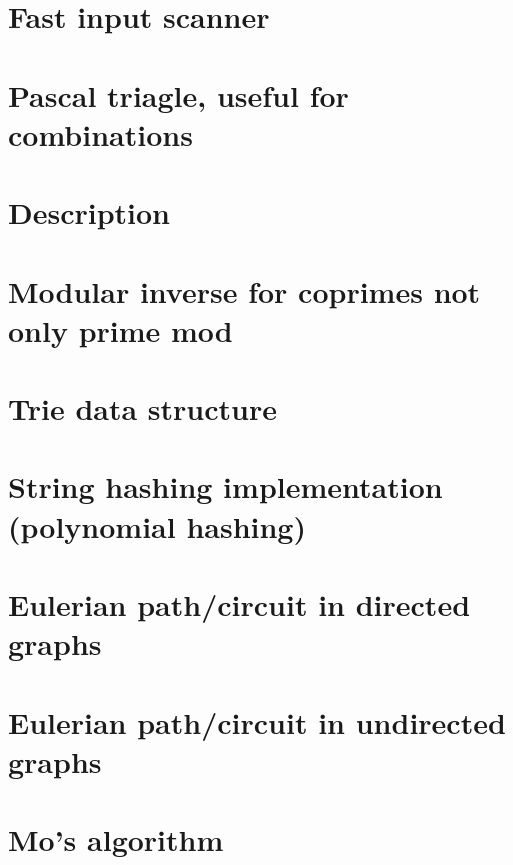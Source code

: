 \section{Fast input scanner}
\raggedbottom

\section{Pascal triagle, useful for combinations}
\raggedbottom

\section{Description}
\raggedbottom

\section{Modular inverse for coprimes not only prime mod}
\raggedbottom

\section{Trie data structure}
\raggedbottom

\section{String hashing implementation (polynomial hashing)}
\raggedbottom

\section{Eulerian path/circuit in directed graphs}
\raggedbottom

\section{Eulerian path/circuit in undirected graphs}
\raggedbottom

\section{Mo's algorithm}
\raggedbottom

